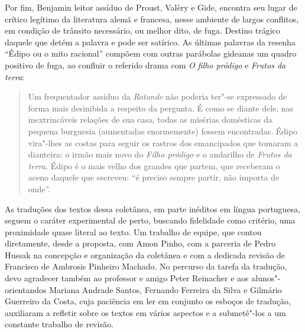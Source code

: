 Por fim, Benjamin leitor assíduo de Proust, Valèry e Gide, encontra seu
lugar de crítico legítimo da literatura alemã e francesa, nesse ambiente
de largos conflitos, em condição de trânsito necessário, ou melhor dito,
de fuga. Destino trágico daquele que detém a palavra e pode ser
satírico. As últimas palavras da resenha ``Édipo ou o mito racional''
compõem com outras parábolas gideanas um quadro positivo de fuga, ao
confluir o referido drama com \emph{O filho pródigo} e \emph{Frutos da
terra}:

\begin{quote}
Um frequentador assíduo da \emph{Rotonde} não poderia ter"-se expressado
de forma mais desinibida a respeito da pergunta. É como se diante dele,
nas inextrincáveis relações de sua casa, todas as misérias domésticas da
pequena burguesia (aumentadas enormemente) fossem encontradas. Édipo
vira"-lhes as costas para seguir os rastros dos emancipados que tomaram a
dianteira: o irmão mais novo do \emph{Filho pródigo} e o andarilho de
\emph{Frutos da terra}. Édipo é o mais velho dos grandes que partem, que
receberam o aceno daquele que escreveu: ``é preciso sempre partir, não
importa de onde''.
\end{quote}

\asterisc

As traduções dos textos dessa coletânea, em parte inéditos em língua
portuguesa, seguem o caráter experimental de perto, buscando fidelidade
como critério, uma proximidade quase literal ao texto. Um trabalho de
equipe, que contou diretamente, desde a proposta, com Amon Pinho, com a
parceria de Pedro Hussak na concepção e organização da coletânea e com a
dedicada revisão de Francisco de Ambrosis Pinheiro Machado. No percurso
da tarefa da tradução, devo agradecer também ao professor e amigo Peter
Reinacher e aos alunos"-orientandos Mariana Andrade Santos, Fernando
Ferreira da Silva e Gilmário Guerreiro da Costa, cuja paciência em ler
em conjunto os esboços de tradução, auxiliaram a refletir sobre os
textos em vários aspectos e a submetê"-los a um constante trabalho de
revisão.
